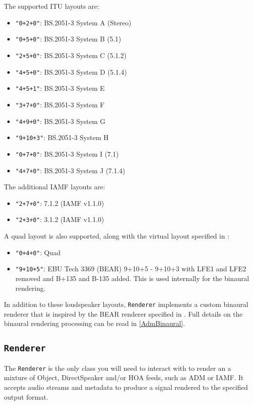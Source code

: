 \documentclass[12pt]{report}
\newcommand{\code}[1]{\texttt{#1}}
\begin{document}
The supported ITU layouts are:
\begin{itemize}
    \item \code{"0+2+0"}: BS.2051-3 System A (Stereo)
    \item \code{"0+5+0"}: BS.2051-3 System B (5.1)
    \item \code{"2+5+0"}: BS.2051-3 System C (5.1.2)
    \item \code{"4+5+0"}: BS.2051-3 System D (5.1.4)
    \item \code{"4+5+1"}: BS.2051-3 System E
    \item \code{"3+7+0"}: BS.2051-3 System F
    \item \code{"4+9+0"}: BS.2051-3 System G
    \item \code{"9+10+3"}: BS.2051-3 System H
    \item \code{"0+7+0"}: BS.2051-3 System I (7.1)
    \item \code{"4+7+0"}: BS.2051-3 System J (7.1.4)
\end{itemize}


The additional IAMF layouts are: 
\begin{itemize}
    \item \code{"2+7+0"}: 7.1.2 (IAMF v1.1.0)
    \item \code{"2+3+0"}: 3.1.2 (IAMF v1.1.0)
\end{itemize}

A quad layout is also supported, along with the virtual layout specified in \cite{EBU3369}:
\begin{itemize}
    \item \code{"0+4+0"}: Quad
    \item \code{"9+10+5"}: EBU Tech 3369 (BEAR) 9+10+5 - 9+10+3 with LFE1 and LFE2 removed and B+135 and B-135 added. This is used internally for the binaural rendering.
\end{itemize}

In addition to these loudspeaker layouts, \code{Renderer} implements a custom binaural renderer that is inspired by the BEAR renderer specified in \cite{EBU3369}. Full details on the binaural rendering processing can be read in \cref{AdmBinaural}.

\subsection{\code{Renderer}}

The \code{Renderer} is the only class you will need to interact with to render an a mixture of Object, DirectSpeaker and/or HOA feeds, such as ADM or IAMF. It accepts audio streams and metadata to produce a signal rendered to the specified output format.
\end{document}
